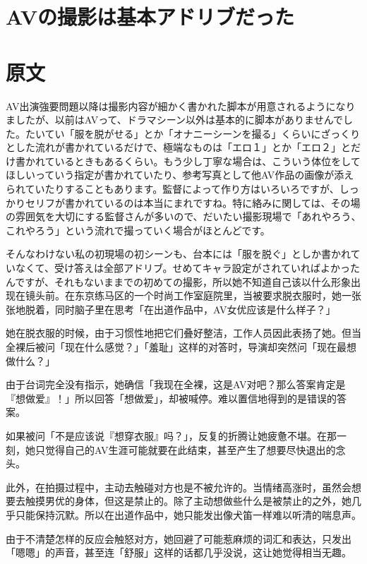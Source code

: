 \documentclass[12pt,UTF8]{ctexbook}
\begin{document}
\switchcolumn

\section{AVの撮影は基本アドリブだった}

\switchcolumn

\section*{原文}

AV出演強要問題以降は撮影内容が細かく書かれた脚本が用意されるようになりましたが、以前はAVって、ドラマシーン以外は基本的に脚本がありませんでした。たいてい「服を脱がせる」とか「オナニーシーンを撮る」くらいにざっくりとした流れが書かれているだけで、極端なものは「エロ１」とか「エロ２」とだけ書かれているときもあるくらい。もう少し丁寧な場合は、こういう体位をしてほしいっていう指定が書かれていたり、参考写真として他AV作品の画像が添えられていたりすることもあります。監督によって作り方はいろいろですが、しっかりセリフが書かれているのは本当にまれですね。特に絡みに関しては、その場の雰囲気を大切にする監督さんが多いので、だいたい撮影現場で「あれやろう、これやろう」という流れで撮っていく場合がほとんどです。

そんなわけない私の初現場の初シーンも、台本には「服を脱ぐ」としか書かれていなくて、受け答えは全部アドリブ。せめてキャラ設定がされていればよかったんですが、それもないままでの初めての撮影，所以她不知道自己该以什么形象出现在镜头前。在东京练马区的一个时尚工作室庭院里，当被要求脱衣服时，她一张张地脱着，同时脑子里在思考「在出道作品中，AV女优应该是什么样子？」

她在脱衣服的时候，由于习惯性地把它们叠好整洁，工作人员因此表扬了她。但当全裸后被问「现在什么感觉？」「羞耻」这样的对答时，导演却突然问「现在最想做什么？」

由于台词完全没有指示，她确信「我现在全裸，这是AV对吧？那么答案肯定是『想做爱』！」所以回答「想做爱」，却被喊停。难以置信地得到的是错误的答案。

如果被问「不是应该说『想穿衣服』吗？」，反复的折腾让她疲惫不堪。在那一刻，她只觉得自己的AV生涯可能就要在此结束，甚至产生了想要尽快退出的念头。

此外，在拍摄过程中，主动去触碰对方也是不被允许的。当情绪高涨时，虽然会想要去触摸男优的身体，但这是禁止的。除了主动想做些什么是被禁止的之外，她几乎只能保持沉默。所以在出道作品中，她只能发出像犬笛一样难以听清的喘息声。

由于不清楚怎样的反应会触怒对方，她回避了可能惹麻烦的词汇和表达，只发出「嗯嗯」的声音，甚至连「舒服」这样的话都几乎没说，这让她觉得相当无趣。
\end{document}
